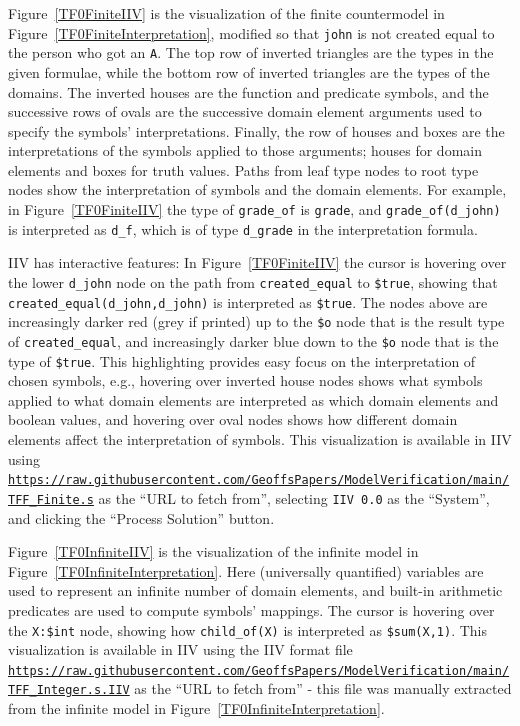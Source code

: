 \documentclass{easychair}
\newcommand{\smalltt}[1]{\small \texttt{#1}}
\begin{document}
Figure~\ref{TF0FiniteIIV} is the visualization of the finite countermodel in 
Figure~\ref{TF0FiniteInterpretation}, modified so that {\smalltt{john}} is not created equal 
to the person who got an {\smalltt{A}}.
The top row of inverted triangles are the types in the given formulae,
while the bottom row of inverted triangles are the types of the domains.
The inverted houses are the function and predicate symbols, and the successive rows of ovals are 
the successive domain element arguments used to specify the symbols' interpretations.
Finally, the row of houses and boxes are the interpretations of the symbols applied to those
arguments; houses for domain elements and boxes for truth values.
Paths from leaf type nodes to root type nodes show the interpretation of symbols and the domain
elements.
For example, in Figure~\ref{TF0FiniteIIV} the type of {\smalltt{grade\_of}} is {\smalltt{grade}},
and {\smalltt{grade\_of(d\_john)}} is interpreted as {\smalltt{d\_f}}, which is of type
{\smalltt{d\_grade}} in the interpretation formula.

IIV has interactive features: In Figure~\ref{TF0FiniteIIV} the cursor is hovering over 
the lower {\smalltt{d\_john}} node on the path from {\smalltt{created\_equal}} to 
{\smalltt{\$true}}, showing that {\smalltt{created\_equal(d\_john,d\_john)}} is interpreted as 
{\smalltt{\$true}}.
The nodes above are increasingly darker red (grey if printed) up to the {\smalltt{\$o}} node
that is the result type of {\smalltt{created\_equal}}, and increasingly darker blue down to 
the {\smalltt{\$o}} node that is the type of {\smalltt{\$true}}.
This highlighting provides easy focus on the interpretation of chosen symbols, e.g., hovering
over inverted house nodes shows what symbols applied to what domain elements are interpreted as 
which domain elements and boolean values, and hovering over oval nodes shows how different domain 
elements affect the interpretation of symbols.
This visualization is available in IIV using 
{\smalltt{\url{https://raw.githubusercontent.com/GeoffsPapers/ModelVerification/main/TFF_Finite.s}}}
as the ``URL to fetch from'',
selecting {\tt IIV 0.0} as the ``System'', and clicking the ``Process Solution'' button.

Figure~\ref{TF0InfiniteIIV} is the visualization of the infinite model in 
Figure~\ref{TF0InfiniteInterpretation}. 
Here (universally quantified) variables are used to represent an infinite number of
domain elements, and built-in arithmetic predicates are used to compute symbols' mappings.
The cursor is hovering over the {\smalltt{X:\$int}} node, showing how 
{\smalltt{child\_of(X)}} is interpreted as {\smalltt{\$sum(X,1)}}.
This visualization is available in IIV using the IIV format file
{\smalltt{\url{https://raw.githubusercontent.com/GeoffsPapers/ModelVerification/main/TFF_Integer.s.IIV}}}
as the ``URL to fetch from'' - this file was manually extracted from the infinite model in 
Figure~\ref{TF0InfiniteInterpretation}.
\end{document}
